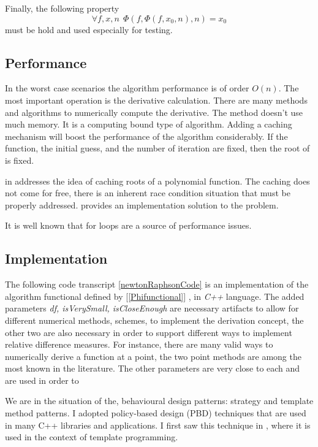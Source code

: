 \documentclass[12pt]{article}
\begin{document}
  Finally, the following property 
  \[
  	\forall f, x, n ~~\Phi(f, \Phi(f, x_0, n), n) = x_0
  \]
  must be hold and used especially for testing.
  
  	\subsection {Performance}
  		In the worst case scenarios the algorithm performance is of order \(O(n)\).  The most important operation is the derivative calculation.  
  		There are many methods and algorithms to numerically compute the derivative.   
  		The method doesn't use much memory.  It is a computing bound type of algorithm.    
  		 Adding a caching mechanism will boost the performance of the algorithm considerably.  
  		 If the function, the initial guess, and the number of iteration are fixed, then the root of is fixed.  
  		 
  		 \citeauthor{meyers2014effective}  in \cite{meyers2014effective}  addresses the idea of caching roots of a polynomial function.  
		 The caching does not come for free, there is an inherent race condition situation that must be properly addressed. 
		 \citeauthor{meyers2014effective} provides an implementation solution to the problem.
		 
		 It is well known that for loops are a source of performance issues.  
  
	\subsection {Implementation}
		
  		The following code transcript \ref{newtonRaphsonCode} is an implementation of the algorithm  functional defined by [\ref{Phifunctional}] , in \textit {C++} language.  
  		The added parameters \textit {df, isVerySmall, isCloseEnough} are necessary artifacts to allow for different
  		numerical methods, schemes, to implement the derivation concept, the other two are also necessary in order to support different ways to implement relative difference measures.
  		For instance, there are many valid ways to numerically derive a function at a point, the two point methods are among the most known in the literature.
  		The other parameters are very close to each and are used in order to
  
  		We are in the situation of the, behavioural design patterns: strategy and template method patterns.  
  I adopted policy-based design (PBD) techniques that are used in many C++ libraries and applications.  
  I first saw this technique in \citet*{alexandrescu}, where it is used in the context of template programming.
  
\end{document}
